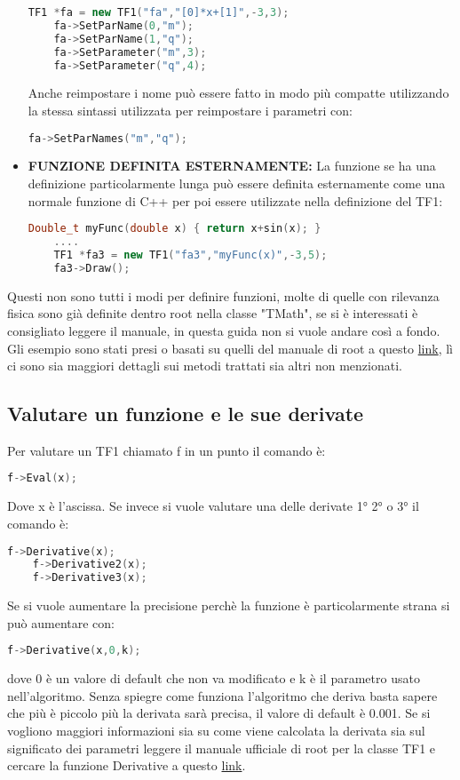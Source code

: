 \begin{itemize}
\begin{lstlisting}[language=C++]
	TF1 *fa = new TF1("fa","[0]*x+[1]",-3,3);
	fa->SetParName(0,"m");
	fa->SetParName(1,"q");
	fa->SetParameter("m",3);
	fa->SetParameter("q",4);
\end{lstlisting} 
Anche reimpostare i nome può essere fatto in modo più compatte utilizzando la stessa sintassi utilizzata per reimpostare i parametri con:
\begin{lstlisting}[language=C++]
	fa->SetParNames("m","q");
\end{lstlisting}
	\item \textbf{FUNZIONE DEFINITA ESTERNAMENTE:} La funzione se ha una definizione particolarmente lunga può essere definita esternamente come una normale funzione di C++ per poi essere utilizzate nella definizione del TF1:
\begin{lstlisting}[language=C++]
	Double_t myFunc(double x) { return x+sin(x); }
	....
	TF1 *fa3 = new TF1("fa3","myFunc(x)",-3,5);
	fa3->Draw();
\end{lstlisting}
\end{itemize}
Questi non sono tutti i modi per definire funzioni, molte di quelle con rilevanza fisica sono già definite dentro root nella classe "TMath", se si è interessati è consigliato leggere il manuale, in questa guida non si vuole andare così a fondo.\\
Gli esempio sono stati presi o basati su quelli del manuale di root a questo \href{https://root.cern.ch/doc/master/classTF1.html}{link}, lì ci sono sia maggiori dettagli sui metodi trattati sia altri non menzionati.

\subsection{Valutare un funzione e le sue derivate}
Per valutare un TF1 chiamato f in un punto il comando è:
\begin{lstlisting}[language=C++]
	f->Eval(x);
\end{lstlisting}
Dove x è l'ascissa. Se invece si vuole valutare una delle derivate 1° 2° o 3° il comando è:
\begin{lstlisting}[language=C++]
	f->Derivative(x);
	f->Derivative2(x);
	f->Derivative3(x);
\end{lstlisting}
Se si vuole aumentare la precisione perchè la funzione è particolarmente strana si può aumentare con:
\begin{lstlisting}[language=C++]
	f->Derivative(x,0,k);
\end{lstlisting}
dove 0 è un valore di default che non va modificato e k è il parametro usato nell'algoritmo. Senza spiegre come funziona l'algoritmo che deriva basta sapere che più è piccolo più la derivata sarà precisa, il valore di default è 0.001. Se si vogliono maggiori informazioni sia su come viene calcolata la derivata sia sul significato dei parametri leggere il manuale ufficiale di root per la classe TF1 e cercare la funzione Derivative a questo  \href{https://root.cern.ch/doc/master/classTF1.html#a59c6f24c0b4d4987e46a83ba0b1f26fa}{link}.

